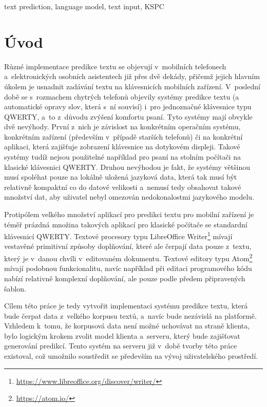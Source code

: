 \documentclass[a4paper,11pt,openany]{book} %
\begin{document}
text prediction, language model, text input, KSPC

\clearpage

\tableofcontents

\clearpage


\chapter*{Úvod}\label{uvod}



Různé implementace predikce textu se objevují v~mobilních telefonech a~elektronických osobních asistentech již přes dvě dekády, přičemž jejich hlavním úkolem je usnadnit zadávání textu na klávesnicích mobilních zařízení. V~poslední době se s~rozmachem chytrých telefonů objevily systémy predikce textu (a automatické opravy slov, která s~ní souvisí) i~pro jednoznačné klávesnice typu QWERTY, a~to z~důvodu zvýšení komfortu psaní. Tyto systémy mají obvykle dvě nevýhody. První z~nich je závislost na konkrétním operačním systému, konkrétním zařízení (především v~případě starších telefonů) či na konkrétní aplikaci, která zajišťuje zobrazení klávesnice na dotykovém displeji. Takové systémy tudíž nejsou použitelné například pro psaní na stolním počítači na klasické klávesnici QWERTY. Druhou nevýhodou je fakt, že systémy většinou musí spoléhat pouze na lokálně uložená jazyková data, která tak musí být relativně kompaktní co do datové velikosti a~nemusí tedy obsahovat takové množství dat, aby uživatel nebyl omezován nedokonalostmi jazykového modelu.

Protipólem velkého množství aplikací pro predikci textu pro mobilní zařízení je téměř prázdná množina takových aplikací pro klasické počítače se standardní klávesnicí QWERTY. Textové procesory typu LibreOffice Writer\footnote{\url{https://www.libreoffice.org/discover/writer/}} mívají vestavěné primitivní způsoby doplňování, které ale čerpají data pouze z~textu, který je v~danou chvíli v~editovaném dokumentu. Textové editory typu Atom\footnote{\url{https://atom.io/}} mívají podobnou funkcionalitu, navíc například při editaci programového kódu nabízí relativně komplexní doplňování, ale pouze podle předem připravených šablon.

Cílem této práce je tedy vytvořit implementaci systému predikce textu, která bude čerpat data z~velkého korpusu textů, a~navíc bude nezávislá na platformě. Vzhledem k~tomu, že korpusová data není možné uchovávat na straně klienta, bylo logickým krokem zvolit model klienta a~serveru, který bude zajišťovat generování predikcí. Tento systém na serveru již v~době tvorby této práce existoval, což umožnilo soustředit se především na vývoj uživatelského prostředí. 
\end{document}
